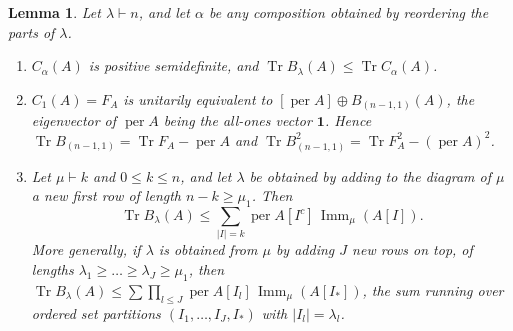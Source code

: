 \documentclass[11pt,a4paper]{article}
\newtheorem{lemma}[theorem]{Lemma}
\theoremstyle{remark}
\newcommand{\per}{\operatorname{per}}
\newcommand{\Tr}{\operatorname{Tr}}
\newcommand{\Imm}{\operatorname{Imm}}
\newcommand{\one}{\mathbf 1}
\begin{document}
\begin{lemma}\label{lem:young}
Let $\lambda\vdash n$, and let $\alpha$ be any composition obtained by reordering the parts of $\lambda$.
\begin{enumerate}
\item $C_\alpha(A)$ is positive semidefinite, and $\Tr B_\lambda(A)\le\Tr C_\alpha(A)$.
\item $C_1(A)=F_A$ is unitarily equivalent to $[\per A]\oplus B_{(n-1,1)}(A)$, the eigenvector of $\per A$ being the all-ones vector $\one$. Hence $\Tr B_{(n-1,1)}=\Tr F_A-\per A$ and $\Tr B_{(n-1,1)}^2=\Tr F_A^2-(\per A)^2$.
\item Let $\mu\vdash k$ and $0\le k\le n$, and let $\lambda$ be obtained by adding to the diagram of $\mu$ a new first row of length $n-k\ge\mu_1$. Then
\[
 \Tr B_\lambda(A)\le\sum_{|I|=k}\per A[I^c]\,\Imm_\mu(A[I]).
\]
More generally, if $\lambda$ is obtained from $\mu$ by adding $J$ new rows on top, of lengths $\lambda_1\ge\dots\ge\lambda_J\ge\mu_1$, then $\Tr B_\lambda(A)\le\sum\prod_{l\le J}\per A[I_l]\,\Imm_\mu(A[I_*])$, the sum running over ordered set partitions $(I_1,\dots,I_J,I_*)$ with $|I_l|=\lambda_l$.
\end{enumerate}
\end{lemma}
\end{document}
